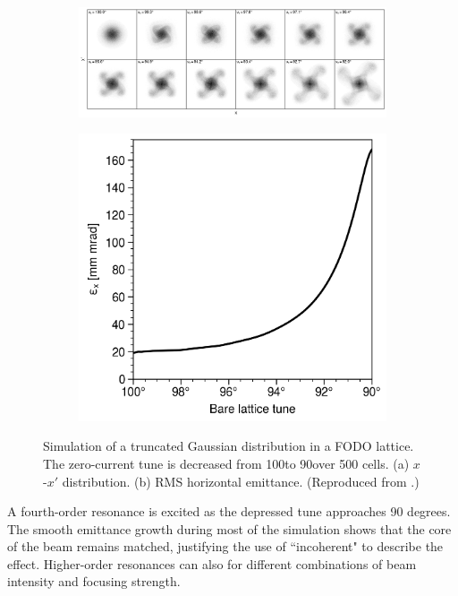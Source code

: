\begin{figure}[!p]
    \centering
    \begin{subfigure}{\textwidth}
        \includegraphics[width=\textwidth]{Images/chapter1/incoherent_resonance_fourth_order.png}
        \label{fig:incoherent_instability_a}
        \caption{}
    \end{subfigure}
    \begin{subfigure}{0.5\textwidth}
        \includegraphics[width=\textwidth]{Images/chapter1/incoherent_resonance_fourth_order_emittance.png}
        \label{fig:incoherent_instability_b}
        \caption{}
    \end{subfigure}
    \caption{Simulation of a truncated Gaussian distribution in a FODO lattice. The zero-current tune is decreased from 100\degree to 90\degree over 500 cells. (a) $x$-$x'$ distribution. (b) RMS horizontal emittance. (Reproduced from \cite{Hofmann2017Book}.)}
    \label{fig:incoherent_instability}
\end{figure}
%
A fourth-order resonance is excited as the depressed tune approaches 90 degrees. The smooth emittance growth during most of the simulation shows that the core of the beam remains matched, justifying the use of ``incoherent" to describe the effect. Higher-order resonances can also for different combinations of beam intensity and focusing strength.


